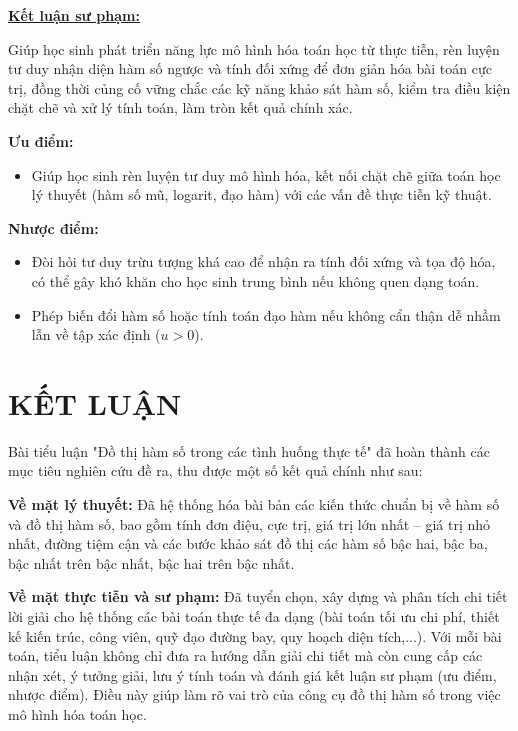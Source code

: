 \documentclass[12pt,a4paper,oneside]{book}
\theoremstyle{theorem}
\theoremstyle{definition}
\begin{document}
        \textbf{\underline{Kết luận sư phạm:}}

        Giúp học sinh phát triển năng lực mô hình hóa toán học từ thực tiễn, rèn luyện tư duy nhận diện hàm số ngược và tính đối xứng để đơn giản hóa bài toán cực trị, đồng thời củng cố vững chắc các kỹ năng khảo sát hàm số, kiểm tra điều kiện chặt chẽ và xử lý tính toán, làm tròn kết quả chính xác.
        
        \textbf{Ưu điểm:}
        \begin{itemize}
            \item Giúp học sinh rèn luyện tư duy mô hình hóa, kết nối chặt chẽ giữa toán học lý thuyết (hàm số mũ, logarit, đạo hàm) với các vấn đề thực tiễn kỹ thuật.
        \end{itemize}
        
        \textbf{Nhược điểm:}
        \begin{itemize}
            \item Đòi hỏi tư duy trừu tượng khá cao để nhận ra tính đối xứng và tọa độ hóa, có thể gây khó khăn cho học sinh trung bình nếu không quen dạng toán.
            \item Phép biến đổi hàm số hoặc tính toán đạo hàm nếu không cẩn thận dễ nhầm lẫn về tập xác định ($u > 0$).
        \end{itemize}

       
    \chapter*{KẾT LUẬN}
    Bài tiểu luận "Đồ thị hàm số trong các tình huống thực tế" đã hoàn thành các mục tiêu nghiên cứu đề ra, thu được một số kết quả chính như sau:   
    
    \textbf{Về mặt lý thuyết:} Đã hệ thống hóa bài bản các kiến thức chuẩn bị về hàm số và đồ thị hàm số, bao gồm tính đơn điệu, cực trị, giá trị lớn nhất – giá trị nhỏ nhất, đường tiệm cận và các bước khảo sát đồ thị các hàm số bậc hai, bậc ba, bậc nhất trên bậc nhất, bậc hai trên bậc nhất.   
    
    \textbf{Về mặt thực tiễn và sư phạm:} Đã tuyển chọn, xây dựng và phân tích chi tiết lời giải cho hệ thống các bài toán thực tế đa dạng (bài toán tối ưu chi phí, thiết kế kiến trúc, công viên, quỹ đạo đường bay, quy hoạch diện tích,...). Với mỗi bài toán, tiểu luận không chỉ đưa ra hướng dẫn giải chi tiết mà còn cung cấp các nhận xét, ý tưởng giải, lưu ý tính toán và đánh giá kết luận sư phạm (ưu điểm, nhược điểm). Điều này giúp làm rõ vai trò của công cụ đồ thị hàm số trong việc mô hình hóa toán học.   
    
\end{document}
